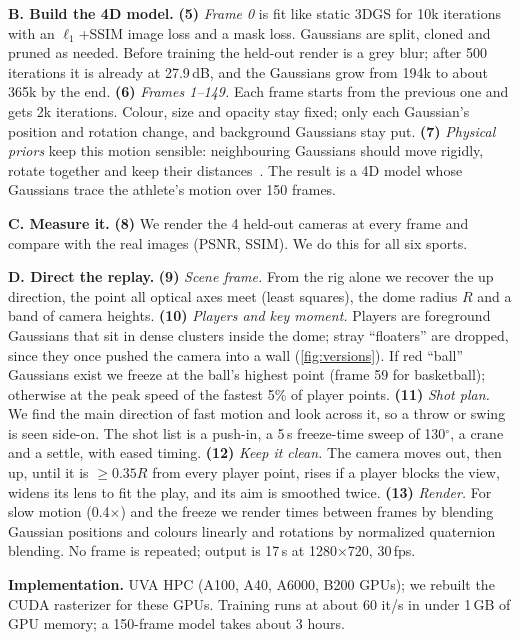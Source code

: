 \documentclass[10pt,twocolumn,letterpaper]{article}
\newcommand{\dB}{\,dB\xspace}
\newcommand{\step}[1]{\textbf{(#1)}}
\begin{document}
\noindent\textbf{B. Build the 4D model.}
\step{5} \emph{Frame 0} is fit like static 3DGS for 10k iterations with an $\ell_1$+SSIM image loss and a mask loss. Gaussians are split, cloned and pruned as needed. Before training the held-out render is a grey blur; after 500 iterations it is already at 27.9\dB, and the Gaussians grow from 194k to about 365k by the end.
\step{6} \emph{Frames 1--149.} Each frame starts from the previous one and gets 2k iterations. Colour, size and opacity stay fixed; only each Gaussian's position and rotation change, and background Gaussians stay put.
\step{7} \emph{Physical priors} keep this motion sensible: neighbouring Gaussians should move rigidly, rotate together and keep their distances~\cite{luiten2024dynamic}. The result is a 4D model whose Gaussians trace the athlete's motion over 150 frames.

\noindent\textbf{C. Measure it.}
\step{8} We render the 4 held-out cameras at every frame and compare with the real images (PSNR, SSIM). We do this for all six sports.

\noindent\textbf{D. Direct the replay.}
\step{9} \emph{Scene frame.} From the rig alone we recover the up direction, the point all optical axes meet (least squares), the dome radius $R$ and a band of camera heights.
\step{10} \emph{Players and key moment.} Players are foreground Gaussians that sit in dense clusters inside the dome; stray ``floaters'' are dropped, since they once pushed the camera into a wall (\cref{fig:versions}). If red ``ball'' Gaussians exist we freeze at the ball's highest point (frame 59 for basketball); otherwise at the peak speed of the fastest 5\% of player points.
\step{11} \emph{Shot plan.} We find the main direction of fast motion and look across it, so a throw or swing is seen side-on. The shot list is a push-in, a 5\,s freeze-time sweep of 130$^\circ$, a crane and a settle, with eased timing.
\step{12} \emph{Keep it clean.} The camera moves out, then up, until it is $\ge 0.35R$ from every player point, rises if a player blocks the view, widens its lens to fit the play, and its aim is smoothed twice.
\step{13} \emph{Render.} For slow motion (0.4$\times$) and the freeze we render times between frames by blending Gaussian positions and colours linearly and rotations by normalized quaternion blending. No frame is repeated; output is 17\,s at 1280$\times$720, 30\,fps.

\noindent\textbf{Implementation.} UVA HPC (A100, A40, A6000, B200 GPUs); we rebuilt the CUDA rasterizer for these GPUs. Training runs at about 60 it/s in under 1\,GB of GPU memory; a 150-frame model takes about 3 hours.
\end{document}
